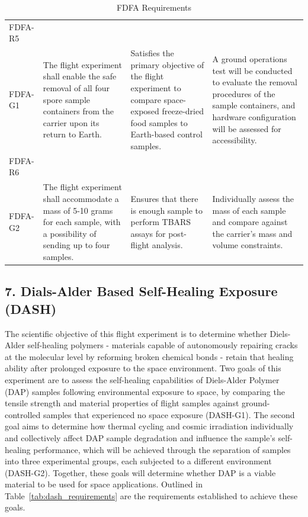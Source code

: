 \documentclass[conf]{new-aiaa}
\begin{document}
\begin{table}[H]
\begin{tabularx}{\textwidth}{@{}>{\raggedright\arraybackslash}m{2.4cm}YYY@{}}
    FDFA-R5\\FDFA-G1 &
    The flight experiment shall enable the safe removal of all four spore sample containers from the carrier upon its return to Earth. &
    Satisfies the primary objective of the flight experiment to compare space-exposed freeze-dried food samples to Earth-based control samples. &
    A ground operations test will be conducted to evaluate the removal procedures of the sample containers, and hardware configuration will be assessed for accessibility. \\ \hline

    FDFA-R6\\FDFA-G2 &
    The flight experiment shall accommodate a mass of 5-10 grams for each sample, with a possibility of sending up to four samples. &
    Ensures that there is enough sample to perform TBARS assays for post-flight analysis. &
    Individually assess the mass of each sample and compare against the carrier's mass and volume constraints. \\
    \bottomrule
    \end{tabularx}
    \caption{FDFA Requirements}
    \label{tab:fdfa_requirements}
\end{table}


\clearpage
\subsection{7. Dials-Alder Based Self-Healing Exposure (DASH)}

The scientific objective of this flight experiment is to determine whether Diels-Alder self-healing polymers - materials capable of autonomously repairing cracks at the molecular level by reforming broken chemical bonds - retain that healing ability after prolonged exposure to the space environment. Two goals of this experiment are to assess the self-healing capabilities of Diels-Alder Polymer (DAP) samples following environmental exposure to space, by comparing the tensile strength and material properties of flight samples against ground-controlled samples that experienced no space exposure (DASH-G1). The second goal aims to determine how thermal cycling and cosmic irradiation individually and collectively affect DAP sample degradation and influence the sample's self-healing performance, which will be achieved through the separation of samples into three experimental groups, each subjected to a different environment (DASH-G2). Together, these goals will determine whether DAP is a viable material to be used for space applications. Outlined in Table~\ref{tab:dash_requirements} are the requirements established to achieve these goals. \cite{zhou2020tailorable}
\end{document}
